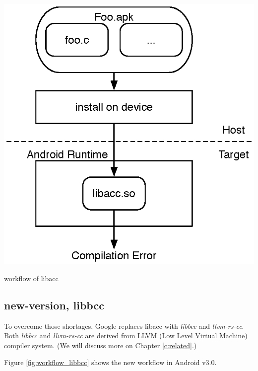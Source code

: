 \begin{center-figure}
	\includegraphics[scale=0.8]{fig/libacc_workflow.eps}
	\caption{workflow of libacc}
	\label{fig:workflow_libacc}
\end{center-figure}

\subsection{new-version, libbcc}
\label{ss:libbcc}
To overcome those shortages, Google replaces libacc with \textit{libbcc} and \textit{llvm-rs-cc}. Both \textit{libbcc} and \textit{llvm-rs-cc} are derived from LLVM (Low Level Virtual Machine) compiler system. (We will discuss more on Chapter \ref{c:related}.)

Figure \ref{fig:workflow_libbcc} shows the new workflow in Android v3.0.

